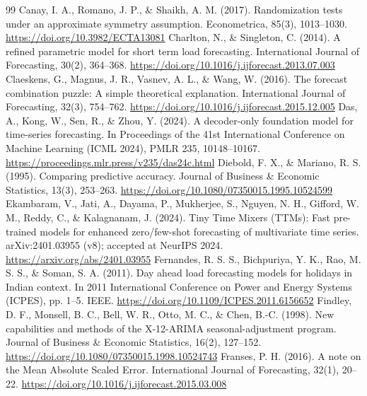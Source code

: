 \documentclass[review,12pt,authoryear]{elsarticle}
\begin{document}
\begin{thebibliography}{99}
Canay, I. A., Romano, J. P., \& Shaikh, A. M. (2017). Randomization tests under an approximate symmetry assumption. Econometrica, 85(3), 1013–1030. \url{https://doi.org/10.3982/ECTA13081}
Charlton, N., \& Singleton, C. (2014). A refined parametric model for short term load forecasting. International Journal of Forecasting, 30(2), 364–368. \url{https://doi.org/10.1016/j.ijforecast.2013.07.003}
Claeskens, G., Magnus, J. R., Vasnev, A. L., \& Wang, W. (2016). The forecast combination puzzle: A simple theoretical explanation. International Journal of Forecasting, 32(3), 754–762. \url{https://doi.org/10.1016/j.ijforecast.2015.12.005}
Das, A., Kong, W., Sen, R., \& Zhou, Y. (2024). A decoder-only foundation model for time-series forecasting. In Proceedings of the 41st International Conference on Machine Learning (ICML 2024), PMLR 235, 10148–10167. \url{https://proceedings.mlr.press/v235/das24c.html}
Diebold, F. X., \& Mariano, R. S. (1995). Comparing predictive accuracy. Journal of Business \& Economic Statistics, 13(3), 253–263. \url{https://doi.org/10.1080/07350015.1995.10524599}
Ekambaram, V., Jati, A., Dayama, P., Mukherjee, S., Nguyen, N. H., Gifford, W. M., Reddy, C., \& Kalagnanam, J. (2024). Tiny Time Mixers (TTMs): Fast pre-trained models for enhanced zero/few-shot forecasting of multivariate time series. arXiv:2401.03955 (v8); accepted at NeurIPS 2024. \url{https://arxiv.org/abs/2401.03955}
Fernandes, R. S. S., Bichpuriya, Y. K., Rao, M. S. S., \& Soman, S. A. (2011). Day ahead load forecasting models for holidays in Indian context. In 2011 International Conference on Power and Energy Systems (ICPES), pp. 1–5. IEEE. \url{https://doi.org/10.1109/ICPES.2011.6156652}
Findley, D. F., Monsell, B. C., Bell, W. R., Otto, M. C., \& Chen, B.-C. (1998). New capabilities and methods of the X-12-ARIMA seasonal-adjustment program. Journal of Business \& Economic Statistics, 16(2), 127–152. \url{https://doi.org/10.1080/07350015.1998.10524743}
Franses, P. H. (2016). A note on the Mean Absolute Scaled Error. International Journal of Forecasting, 32(1), 20–22. \url{https://doi.org/10.1016/j.ijforecast.2015.03.008}

\end{thebibliography}
\end{document}
